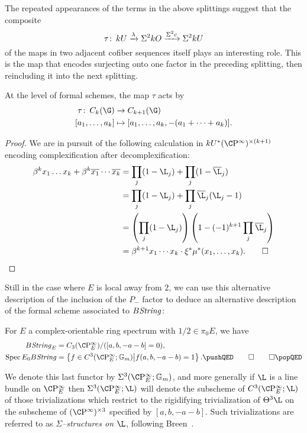 The repeated appearances of the terms in the above splittings suggest that the composite \[\tau\colon\thinspace kU \xrightarrow{\lambda} \Sigma^2 kO \xrightarrow{\Sigma^2 c} \Sigma^2 kU\] of the maps in two adjacent cofiber sequences itself plays an interesting role.  This is the map that encodes surjecting onto one factor in the preceding splitting, then reincluding it into the next splitting.
\begin{lemma}
At the level of formal schemes, the map \(\tau\) acts by
\begin{align*}
\tau\co C_k(\G) & \to C_{k+1}(\G) \\
[a_1, \ldots, a_k] & \mapsto [a_1, \ldots, a_k, -(a_1 + \cdots + a_k)].
\end{align*}
\end{lemma}
\begin{proof}
We are in pursuit of the following calculation in \(kU^* (\CP^\infty)^{\times (k+1)}\) encoding complexification after decomplexification:
\begin{align*}
\beta^k x_1 \ldots x_k + \beta^k \overline{x_1} \cdots \overline{x_k} & = \prod_j (1 - \L_j) + \prod_j (1 - \overline \L_j) \\
& = \prod_j (1 - \L_j) + \prod_j \overline \L_j (\L_j - 1) \\
& = \left(\prod_j (1 - \L_j)\right) \left(1 - (-1)^{k+1} \prod_j \overline \L_j\right) \\
& = \beta^{k+1} x_1 \cdots x_k \cdot \xi^* \mu^*(x_1, \ldots, x_k). \qedhere
\end{align*}
\end{proof}
Still in the case where \(E\) is local away from \(2\), we can use this alternative description of the inclusion of the \(P_-\) factor to deduce an alternative description of the formal scheme associated to \(B\mathit{String}\):
\begin{corollary}
For \(E\) a complex-orientable ring spectrum with \(1/2 \in \pi_0 E\), we have
\begin{align*}
B\String_E & = C_3(\CP^\infty_E) / ([a, b, -a-b] = 0), \\
\Spec E_0 B\String & = \left\{ f \in C^3(\CP^\infty_E; \Gm) \middle| f(a, b, -a-b) = 1 \right\}. \pushQED\qed\qedhere\popQED
\end{align*}
\end{corollary}

\begin{definition}
We denote this last functor by \(\Sigma^3(\CP^\infty_E; \Gm)\), and more generally if \(\L\) is a line bundle on \(\CP^\infty_E\) then \(\Sigma^3(\CP^\infty_E; \L)\) will denote the subscheme of \(C^3(\CP^\infty_E; \L)\) of those trivializations which restrict to the rigidifying trivialization of \(\Theta^3 \L\) on the subscheme of \((\CP^\infty)^{\times 3}\) specified by \([a, b, -a-b]\).  Such trivializations are referred to as \textit{\(\Sigma\)--structures on \(\L\)}, following Breen~\cite[Section 5]{Breen}.
\end{definition}

